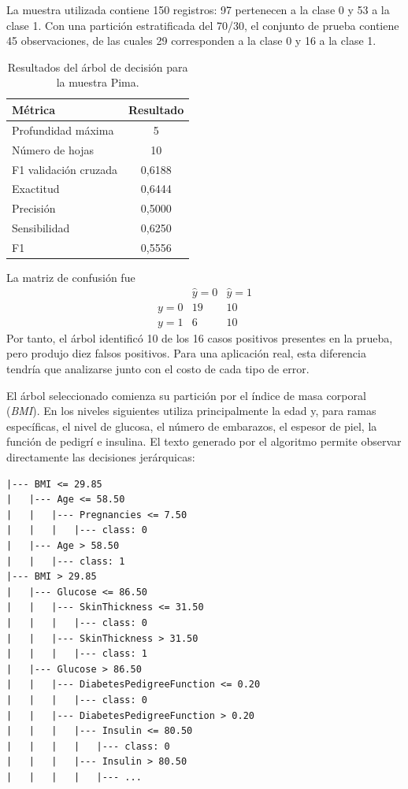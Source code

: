 \documentclass[14pt,twoside]{article}
\begin{document}
La muestra utilizada contiene 150 registros: 97 pertenecen a la clase 0 y 53 a la clase 1. Con una partición estratificada del 70/30, el conjunto de prueba contiene 45 observaciones, de las cuales 29 corresponden a la clase 0 y 16 a la clase 1.

\begin{table}[H]
\centering
\caption{Resultados del árbol de decisión para la muestra Pima.}
\begin{tabular}{lc}
\toprule
Métrica & Resultado \\
\midrule
Profundidad máxima & 5 \\
Número de hojas & 10 \\
F1 validación cruzada & 0,6188 \\
Exactitud & 0,6444 \\
Precisión & 0,5000 \\
Sensibilidad & 0,6250 \\
F1 & 0,5556 \\
\bottomrule
\end{tabular}
\end{table}

La matriz de confusión fue
\[
\begin{array}{c|cc}
 & \hat y=0 & \hat y=1\\
\hline
y=0&19&10\\
y=1&6&10
\end{array}
\]
Por tanto, el árbol identificó 10 de los 16 casos positivos presentes en la prueba, pero produjo diez falsos positivos. Para una aplicación real, esta diferencia tendría que analizarse junto con el costo de cada tipo de error.

El árbol seleccionado comienza su partición por el índice de masa corporal (\textit{BMI}). En los niveles siguientes utiliza principalmente la edad y, para ramas específicas, el nivel de glucosa, el número de embarazos, el espesor de piel, la función de pedigrí e insulina. El texto generado por el algoritmo permite observar directamente las decisiones jerárquicas:

\begin{lstlisting}[style=pgterminal,caption={Fragmento de la estructura del árbol seleccionado.}]
|--- BMI <= 29.85
|   |--- Age <= 58.50
|   |   |--- Pregnancies <= 7.50
|   |   |   |--- class: 0
|   |--- Age > 58.50
|   |   |--- class: 1
|--- BMI > 29.85
|   |--- Glucose <= 86.50
|   |   |--- SkinThickness <= 31.50
|   |   |   |--- class: 0
|   |   |--- SkinThickness > 31.50
|   |   |   |--- class: 1
|   |--- Glucose > 86.50
|   |   |--- DiabetesPedigreeFunction <= 0.20
|   |   |   |--- class: 0
|   |   |--- DiabetesPedigreeFunction > 0.20
|   |   |   |--- Insulin <= 80.50
|   |   |   |   |--- class: 0
|   |   |   |--- Insulin > 80.50
|   |   |   |   |--- ...
\end{lstlisting}
\end{document}
